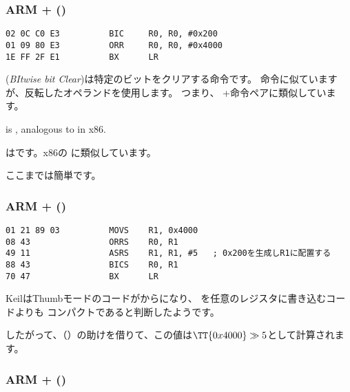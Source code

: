 \subsubsection{ARM + \OptimizingKeilVI (\ARMMode)}

\begin{lstlisting}[caption=\OptimizingKeilVI (\ARMMode),style=customasmARM]
02 0C C0 E3          BIC     R0, R0, #0x200
01 09 80 E3          ORR     R0, R0, #0x4000
1E FF 2F E1          BX      LR
\end{lstlisting}

 (\emph{BItwise bit Clear})は特定のビットをクリアする命令です。
\AND 命令に似ていますが、反転したオペランドを使用します。
つまり、 \NOT+\AND 命令ペアに類似しています。

 is , analogous to \OR in x86.

 はです。x86の \OR に類似しています。

ここまでは簡単です。

\subsubsection{ARM + \OptimizingKeilVI (\ThumbMode)}

\begin{lstlisting}[caption=\OptimizingKeilVI (\ThumbMode),style=customasmARM]
01 21 89 03          MOVS    R1, 0x4000
08 43                ORRS    R0, R1
49 11                ASRS    R1, R1, #5   ; 0x200を生成しR1に配置する
88 43                BICS    R0, R1
70 47                BX      LR
\end{lstlisting}

KeilはThumbモードのコードがからになり、
を任意のレジスタに書き込むコードよりも
コンパクトであると判断したようです。


したがって、（\ASRdesc）の助けを借りて、この値は$\TT{0x4000} \gg 5$として計算されます。

\subsubsection{ARM + \OptimizingXcodeIV (\ARMMode)}
\label{anomaly:LLVM}
\myindex{\CompilerAnomaly}

